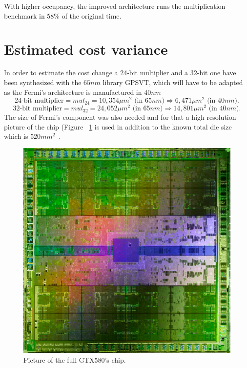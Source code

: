 \documentclass{report}
\begin{document}
    With higher occupancy, the improved architecture runs the multiplication benchmark in 58\% of the original time.

   \section{Estimated cost variance}
   In order to estimate the cost change a 24-bit multiplier and a 32-bit one have been synthesized with the $65nm$ library GPSVT, which will have to be adapted as the Fermi's architecture is manufactured in $40nm$~\cite{GTX580Datasheet}
   \[\text{24-bit multiplier} = mul_{24} = 10,354 \mu m^2 \text{ (in $65nm$)} \Rightarrow 6,471 \mu m^2 \text{ (in $40nm$)}.\]
   \[\text{32-bit multiplier} = mul_{32} = 24,052 \mu m^2 \text{ (in $65nm$)} \Rightarrow 14,801 \mu m^2 \text{ (in $40nm$)}.\]
   The size of Fermi's component was also needed and for that a high resolution picture of the chip (Figure ~\ref{fig:fermiChip} is used in addition to the known total die size which is $520 mm^2$~\cite{G5xxwiki}.
   \begin{figure}[H]
    \centering
        \includegraphics[width=0.7\linewidth]{pictures/FermiChip}
        \captionsetup{justification=centering}
        \caption{Picture of the full GTX580's chip.}
        \label{fig:fermiChip}
    \end{figure}
   
\end{document}
